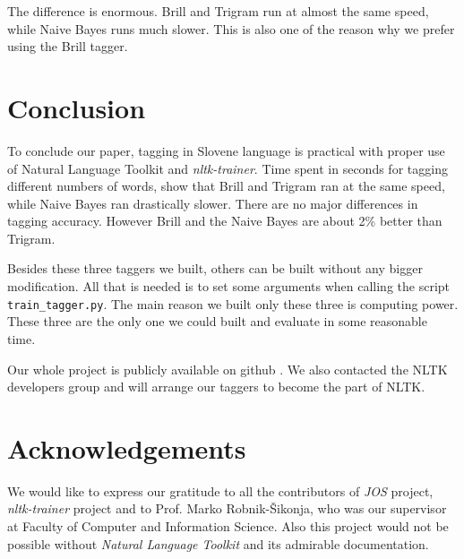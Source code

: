 \documentclass[10pt, conference, compsocconf]{IEEEtran}
\begin{document}
The difference is enormous. Brill and Trigram run at almost the same speed, while Naive Bayes runs much slower. This is also one of the reason why we prefer using the Brill tagger. 

\section{Conclusion} %
To conclude our paper, tagging in Slovene language is practical with proper use of Natural Language Toolkit and \textit{nltk-trainer}. Time spent in seconds for tagging different numbers of words, show that Brill and Trigram ran at the same speed, while Naive Bayes ran drastically slower. There are no major differences in tagging accuracy. However Brill and the Naive Bayes are about 2\% better than Trigram.
\par
Besides these three taggers we built, others can be built without any bigger modification. All that is needed is to set some arguments when calling the script \texttt{train\_tagger.py}. The main reason we built only these three is computing power. These three are the only one we could built and evaluate in some reasonable time.
\par
Our whole project is publicly available on github \cite{CODE}. We also contacted the NLTK developers group and will arrange our taggers to become the part of NLTK.

\section*{Acknowledgements} %
We would like to express our gratitude to all the contributors of \textit{JOS} \cite{JOS} project, \textit{nltk-trainer} \cite{nltk-trainer} project and to Prof. Marko Robnik-Šikonja, who was our supervisor at Faculty of Computer and Information Science. Also this project would not be possible without \textit{Natural Language Toolkit} \cite{nltk} and its admirable documentation.
\end{document}
